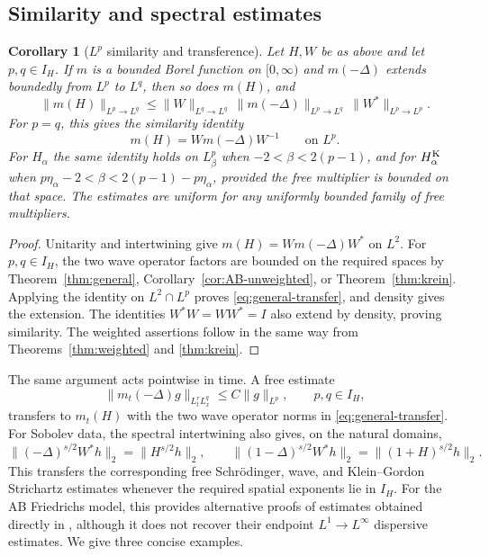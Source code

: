 \documentclass[11pt,a4paper,reqno,backref=page]{amsart}
\numberwithin{equation}{section}
\newtheorem{corollary}[theorem]{Corollary}
\theoremstyle{definition}
\theoremstyle{remark}
\begin{document}
\subsection{Similarity and spectral estimates}

\begin{corollary}[$L^p$ similarity and transference]
\label{cor:transfer}
  Let $H,W$ be as above and let $p,q\in I_H$. If $m$ is a
  bounded Borel function on $[0,\infty)$ and $m(-\Delta)$
  extends boundedly from $L^p$ to $L^q$, then so does $m(H)$,
  and
  \begin{equation}\label{eq:general-transfer}
    \|m(H)\|_{L^p\to L^q}
    \le \|W\|_{L^q\to L^q}\,
    \|m(-\Delta)\|_{L^p\to L^q}\,
    \|W^*\|_{L^p\to L^p}.
  \end{equation}
  For $p=q$, this gives the similarity identity
  \begin{equation*}
    m(H)=Wm(-\Delta)W^{-1}
    \qquad\text{on }L^p.
  \end{equation*}
  For $H_\alpha$ the same identity holds on $L^p_\beta$ when
  $-2<\beta<2(p-1)$, and for $H_\alpha^{\rm K}$ when
  $p\eta_\alpha-2<\beta<2(p-1)-p\eta_\alpha$, provided the
  free multiplier is bounded on that space. The estimates
  are uniform for any uniformly bounded family of free
  multipliers.
\end{corollary}

\begin{proof}
  Unitarity and intertwining give
  $m(H)=Wm(-\Delta)W^*$ on $L^2$. For $p,q\in I_H$, the
  two wave operator factors are bounded on the required
  spaces by Theorem~\ref{thm:general},
  Corollary~\ref{cor:AB-unweighted}, or
  Theorem~\ref{thm:krein}. Applying the identity on
  $L^2\cap L^p$ proves \eqref{eq:general-transfer}, and
  density gives the extension. The identities
  $W^*W=WW^*=I$ also extend by density, proving similarity.
  The weighted assertions follow in the same way from
  Theorems~\ref{thm:weighted} and \ref{thm:krein}.
\end{proof}

The same argument acts pointwise in time. A free estimate
\begin{equation}\label{eq:spacetime-transfer}
  \|m_t(-\Delta)g\|_{L_t^rL_x^q}\le C\|g\|_{L^p},
  \qquad p,q\in I_H,
\end{equation}
transfers to $m_t(H)$ with the two wave operator norms in
\eqref{eq:general-transfer}. For Sobolev data, the spectral
intertwining also gives, on the natural domains,
\begin{equation*}
  \|(-\Delta)^{s/2}W^*h\|_2=\|H^{s/2}h\|_2,\qquad
  \|(1-\Delta)^{s/2}W^*h\|_2=\|(1+H)^{s/2}h\|_2.
\end{equation*}
This transfers the corresponding free Schr\"odinger, wave,
and Klein--Gordon Strichartz estimates whenever the required
spatial exponents lie in $I_H$. For the AB Friedrichs model,
this provides alternative proofs of estimates obtained
directly in \cite{FFFP2013,FZZ2022,GYZZ2022},
although it does not recover their endpoint $L^1\to L^\infty$ 
dispersive estimates. We give three concise examples.
\end{document}
